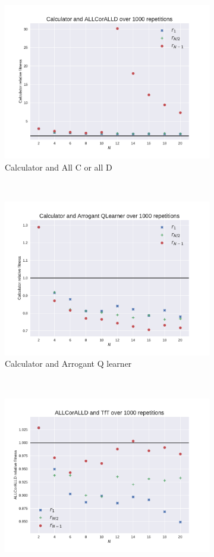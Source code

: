 \documentclass{article}
\begin{document}
\begin{figure}[!hbtp]
    \begin{subfigure}[t]{.3\textwidth}
        \centering
        \includegraphics[width=.8\textwidth]{./img/Calculator_v_ALLCorALLD_fitness.pdf}
        \caption{Calculator and All C or all D}
    \end{subfigure}%
    ~
    \begin{subfigure}[t]{.3\textwidth}
        \centering
        \includegraphics[width=.8\textwidth]{./img/Calculator_v_Arrogant_QLearner_fitness.pdf}
        \caption{Calculator and Arrogant Q learner}
    \end{subfigure}%
    ~
    \begin{subfigure}[t]{.3\textwidth}
        \centering
        \includegraphics[width=.8\textwidth]{./img/ALLCorALLD_v_TfT_fitness.pdf}

\end{subfigure}
\end{figure}
\end{document}
